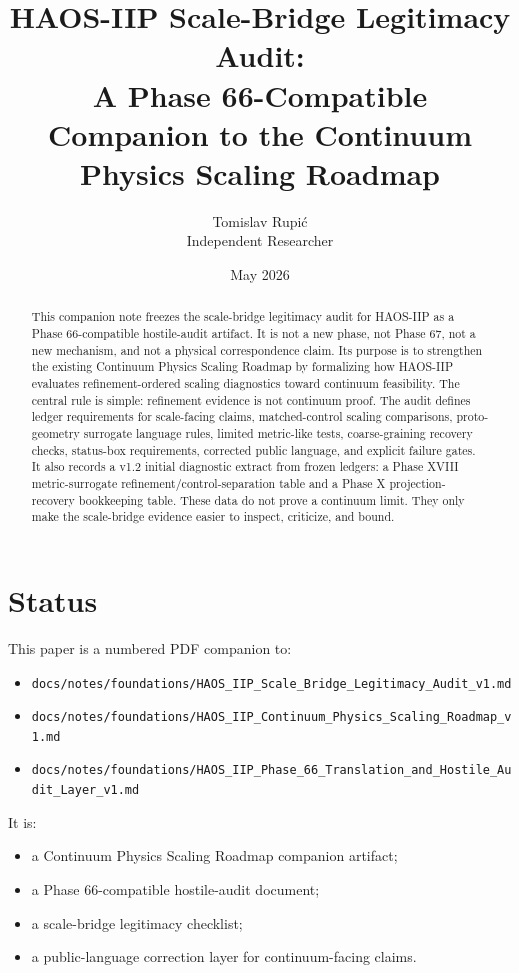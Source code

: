 \documentclass[11pt]{article}
\title{HAOS-IIP Scale-Bridge Legitimacy Audit:\\A Phase 66-Compatible Companion to the Continuum Physics Scaling Roadmap}
\author{Tomislav Rupi\'c \\ Independent Researcher}
\date{May 2026}
\begin{document}
\maketitle

\begin{abstract}
This companion note freezes the scale-bridge legitimacy audit for HAOS-IIP as a Phase 66-compatible hostile-audit artifact. It is not a new phase, not Phase 67, not a new mechanism, and not a physical correspondence claim. Its purpose is to strengthen the existing Continuum Physics Scaling Roadmap by formalizing how HAOS-IIP evaluates refinement-ordered scaling diagnostics toward continuum feasibility. The central rule is simple: refinement evidence is not continuum proof. The audit defines ledger requirements for scale-facing claims, matched-control scaling comparisons, proto-geometry surrogate language rules, limited metric-like tests, coarse-graining recovery checks, status-box requirements, corrected public language, and explicit failure gates. It also records a v1.2 initial diagnostic extract from frozen ledgers: a Phase XVIII metric-surrogate refinement/control-separation table and a Phase X projection-recovery bookkeeping table. These data do not prove a continuum limit. They only make the scale-bridge evidence easier to inspect, criticize, and bound.
\end{abstract}

\section{Status}

This paper is a numbered PDF companion to:
\begin{itemize}
\item \texttt{docs/notes/foundations/HAOS\_IIP\_Scale\_Bridge\_Legitimacy\_Audit\_v1.md}
\item \texttt{docs/notes/foundations/HAOS\_IIP\_Continuum\_Physics\_Scaling\_Roadmap\_v1.md}
\item \texttt{docs/notes/foundations/HAOS\_IIP\_Phase\_66\_Translation\_and\_Hostile\_Audit\_Layer\_v1.md}
\end{itemize}

It is:
\begin{itemize}
\item a Continuum Physics Scaling Roadmap companion artifact;
\item a Phase 66-compatible hostile-audit document;
\item a scale-bridge legitimacy checklist;
\item a public-language correction layer for continuum-facing claims.
\end{itemize}
\end{document}
